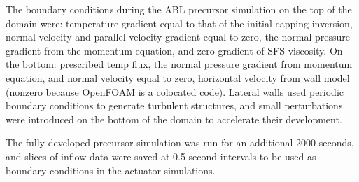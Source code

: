 The boundary conditions during the ABL precursor simulation on the top of the domain were: temperature gradient equal to that of the initial capping inversion, normal velocity  and parallel velocity gradient equal to zero, the normal pressure gradient from the momentum equation, and zero gradient of SFS viscosity.  On the bottom: prescribed temp flux, the normal pressure gradient from momentum equation, and normal velocity equal to zero, horizontal velocity from wall model (nonzero because OpenFOAM is a colocated code).  Lateral walls used periodic boundary conditions to generate turbulent structures, and small perturbations were introduced on the bottom of the domain to accelerate their development.

The fully developed precursor simulation was run for an additional 2000 seconds, and slices of inflow data were saved at 0.5 second intervals to be used as boundary conditions in the actuator simulations.
